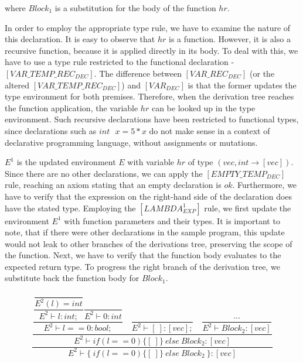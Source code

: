 where $Block_1$ is a substitution for the body of the function $hr$.

\newblock
\par
In order to employ the appropriate type rule, we have to examine the nature of this declaration. It is easy to observe that $hr$ is a function. However, it is also a recursive function, because it is applied directly in its body. To deal with this, we have to use a type rule restricted to the functional declaration - $[VAR\_TEMP\_REC_{DEC}]$. The difference between $[VAR\_REC_{DEC}]$ (or the altered $[VAR\_TEMP\_REC_{DEC}]$) and $[VAR_{DEC}]$ is that the former updates the type environment for both premises. Therefore, when the derivation tree reaches the function application, the variable $hr$ can be looked up in the type environment. Such recursive declarations have been restricted to functional types, since declarations such as $int \text{ } x = 5 * x$ do not make sense in a context of declarative programming language, without assignments or mutations. 

\par
$E^1$ is the updated environment $E$ with variable $hr$ of type $(vec,int \rightarrow [vec])$. Since there are no other declarations, we can apply the $[EMPTY\_TEMP_{DEC}]$ rule, reaching an axiom stating that an empty declaration is $ok$. Furthermore, we have to verify that the expression on the right-hand side of the declaration does have the stated type. Employing the $[LAMBDA^1_{EXP}]$ rule, we first update the environment $E^1$ with function parameters and their types. It is important to note, that if there were other declarations in the sample program, this update would not leak to other branches of the derivations tree, preserving the scope of the function. Next, we have to verify that the function body evaluates to the expected return type. To progress the right branch of the derivation tree, we substitute back the function body for $Block_1$.



\begin{align*}
    \dfrac
    {
        \dfrac
        { \dfrac
        {
            \dfrac{\dfrac{}{E^2(l) = int}}{E^2 \vdash l \colon int;}
            \dfrac{}{E^2 \vdash 0 \colon int}
        }
        {E^2 \vdash l == 0 \colon bool;}
        \quad
        \dfrac
        {\:}
        {E^2 \vdash [ \: ] \colon [vec];} 
        \quad
        \dfrac
        {...}
        {E^2 \vdash Block_2 \colon [vec]}}
        {E^2 \vdash if (l == 0) \{ [ \: ] \} \: else \: Block_2 \colon [vec]}
    }
    {
        E^2 \vdash \{ \: if (l == 0) \{ [ \: ] \} \: else \: Block_2 \: \} \colon [vec]
    }
\end{align*}

